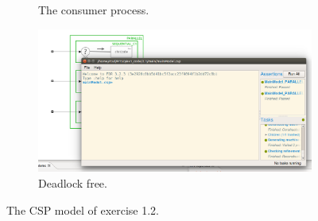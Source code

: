 \documentclass[a4paper,twoside,11pt]{article}
\begin{document}
\begin{figure}
\begin{subfigure}{0.5\textwidth}
  \caption{The consumer process.}
 \end{subfigure}
 \begin{subfigure}{0.7\textwidth}
	 \centering
	 \includegraphics[width=\textwidth]{./images/2-1_fdr.png}
	 \caption{Deadlock free.}
 \end{subfigure}
 \caption{The CSP model of exercise 1.2.}
 \label{fig:typicalcsp}
\end{figure}
\end{document}
